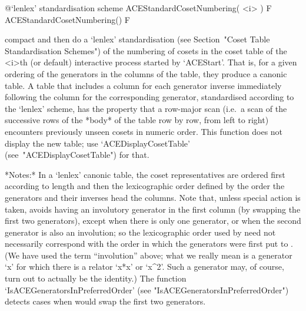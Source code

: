 %
{@\noexpand`lenlex' standardisation scheme}
\>ACEStandardCosetNumbering( <i> ) F
\>ACEStandardCosetNumbering() F

compact and then do a  `lenlex'  standardisation  (see  Section~"Coset
Table Standardisation Schemes") of the  numbering  of  cosets  in  the
coset table of the  <i>th  (or  default)  interactive  {\ACE}  process
started by `ACEStart'. That is, for a given ordering of the generators
in the columns of the table, they produce a  canonic  table.  A  table
that  includes  a  column  for  each  generator  inverse   immediately
following the column for  the  corresponding  generator,  standardised
according to the `lenlex' scheme, has the property  that  a  row-major
scan (i.e.~a scan of the successive rows of the *body*  of  the  table
row by row, from left to right) encounters previously unseen cosets in
numeric order. This function does  not  display  the  new  table;  use
`ACEDisplayCosetTable' (see~"ACEDisplayCosetTable") for that.

*Notes:*
In a `lenlex' canonic table, the  coset  representatives  are  ordered
first according to length and then the lexicographic order defined  by
the order the generators and their inverses  head  the  columns.  Note
that,  unless  special  action  is  taken,  {\ACE}  avoids  having  an
involutory generator in the first column (by swapping  the  first  two
generators), except when there is only  one  generator,  or  when  the
second generator is also an involution;  so  the  lexicographic  order
used by {\ACE} need not necessarily correspond with the order in which
the generators were first put  to  {\ACE}.  (We  have  used  the  term
``involution'' above; what we really mean is  a  generator  `x'  for
which there is a relator `x*x' or `x^2'.  Such  a  generator  may,  of
course,  turn  out  to  actually  be  the  identity.)   The   function
`IsACEGeneratorsInPreferredOrder'                                 (see
"IsACEGeneratorsInPreferredOrder") detects  cases  when  {\ACE}  would
swap the first two generators.

